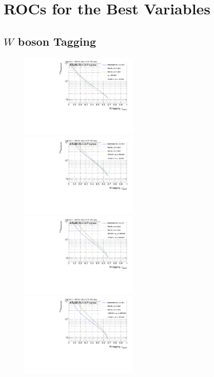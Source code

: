 

\chapter{ROCs for the Best Variables}\label{chp:best_ROC}
\section{$W$ boson Tagging}
\begin{figure}
\includegraphics[width=0.5\textwidth]{sascha_input/Appendix/W_best/ROC_ALL_h_recoJet_D2_bin1.pdf} \hspace{1mm}
\includegraphics[width=0.5\textwidth]{sascha_input/Appendix/W_best/ROC_ALL_h_recoJet_D2_bin2.pdf}
\bigskip
\includegraphics[width=0.5\textwidth]{sascha_input/Appendix/W_best/ROC_ALL_h_recoJet_D2_bin3.pdf} \hspace{1mm}
\includegraphics[width=0.5\textwidth]{sascha_input/Appendix/W_best/ROC_ALL_h_recoJet_D2_bin4.pdf}

\end{figure}
